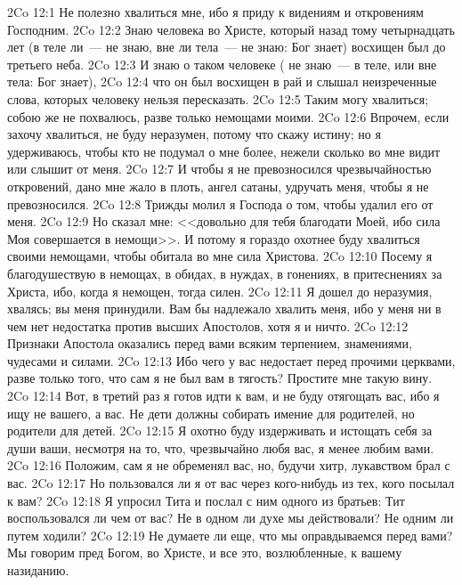 \vs 2Co 12:1 Не полезно хвалиться мне, ибо я приду к видениям и откровениям Господним.
\vs 2Co 12:2 Знаю человека во Христе, который назад тому четырнадцать лет (в теле ли~--- не знаю, вне ли тела~--- не знаю: Бог знает) восхищен был до третьего неба.
\vs 2Co 12:3 И знаю о таком человеке ( не знаю~--- в теле, или вне тела: Бог знает),
\vs 2Co 12:4 что он был восхищен в рай и слышал неизреченные слова, которых человеку нельзя пересказать.
\vs 2Co 12:5 Таким  могу хвалиться; собою же не похвалюсь, разве только немощами моими.
\vs 2Co 12:6 Впрочем, если захочу хвалиться, не буду неразумен, потому что скажу истину; но я удерживаюсь, чтобы кто не подумал о мне более, нежели сколько во мне видит или слышит от меня.
\vs 2Co 12:7 И чтобы я не превозносился чрезвычайностью откровений, дано мне жало в плоть, ангел сатаны, удручать меня, чтобы я не превозносился.
\vs 2Co 12:8 Трижды молил я Господа о том, чтобы удалил его от меня.
\vs 2Co 12:9 Но  сказал мне: <<довольно для тебя благодати Моей, ибо сила Моя совершается в немощи>>. И потому я гораздо охотнее буду хвалиться своими немощами, чтобы обитала во мне сила Христова.
\vs 2Co 12:10 Посему я благодушествую в немощах, в обидах, в нуждах, в гонениях, в притеснениях за Христа, ибо, когда я немощен, тогда силен.
\rsbpar\vs 2Co 12:11 Я дошел до неразумия, хвалясь; вы меня  принудили. Вам бы надлежало хвалить меня, ибо у меня ни в чем нет недостатка против высших Апостолов, хотя я и ничто.
\vs 2Co 12:12 Признаки Апостола оказались перед вами всяким терпением, знамениями, чудесами и силами.
\vs 2Co 12:13 Ибо чего у вас недостает перед прочими церквами, разве только того, что сам я не был вам в тягость? Простите мне такую вину.
\vs 2Co 12:14 Вот, в третий раз я готов идти к вам, и не буду отягощать вас, ибо я ищу не вашего, а вас. Не дети должны собирать имение для родителей, но родители для детей.
\vs 2Co 12:15 Я охотно буду издерживать  и истощать себя за души ваши, несмотря на то, что, чрезвычайно любя вас, я менее любим вами.
\vs 2Co 12:16 Положим,  сам я не обременял вас, но, будучи хитр, лукавством брал с вас.
\vs 2Co 12:17 Но пользовался ли я  от вас через кого-нибудь из тех, кого посылал к вам?
\vs 2Co 12:18 Я упросил Тита и послал с ним одного из братьев: Тит воспользовался ли чем от вас? Не в одном ли духе мы действовали? Не одним ли путем ходили?
\rsbpar\vs 2Co 12:19 Не думаете ли еще, что мы  оправдываемся перед вами? Мы говорим пред Богом, во Христе, и все это, возлюбленные, к вашему назиданию.
